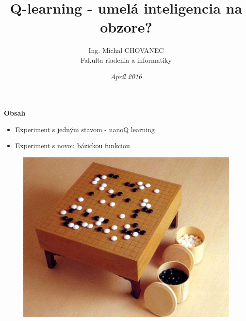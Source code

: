\documentclass[xcolor=dvipsnames]{beamer}
\title{\bf Q-learning - umelá inteligencia na obzore?}
\author{Ing. Michal CHOVANEC \\Fakulta riadenia a informatiky}
\date[EURP]{\it Apríl 2016}
\begin{document}
\begin{frame}
\titlepage
\end{frame}




\begin{frame}{\bf Obsah}

\begin{minipage}{.5\textwidth}

\begin{itemize}
  \item Experiment s jedným stavom - nanoQ learning
  \item Experiment s novou bázickou funkciou
\end{itemize}

  \end{minipage}%
\begin{minipage}{.5\textwidth}

  \begin{figure}[!htb]
  \centering
  \includegraphics[scale=.7]{../pictures/go.jpg}
  \end{figure}

\end{minipage}

\end{frame}
\end{document}
